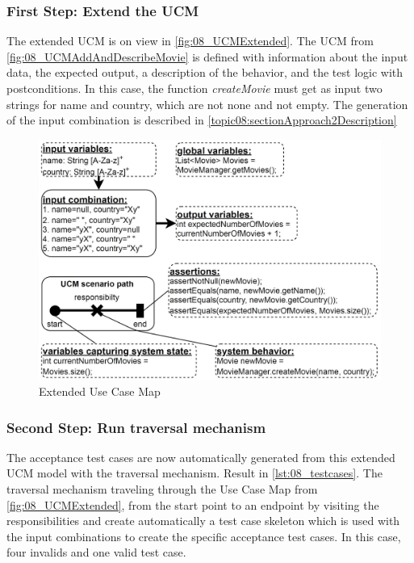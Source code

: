 \subsubsection{First Step: Extend the UCM}
The extended UCM is on view in \autoref{fig:08_UCMExtended}. The UCM from \autoref{fig:08_UCMAddAndDescribeMovie} is defined with information about the input
data, the expected output, a description of the behavior, and the test logic with postconditions. In this case, the function \textit{createMovie} must get as input two strings for name and country, which are not none and not empty. The generation of the input combination is described in \autoref{topic08:sectionApproach2Description}

\begin{figure}[h]
	\centering
	\includegraphics[scale=0.5]{../images/08/08_UCMExtended.jpg} 
	\caption{Extended Use Case Map}
	\label{fig:08_UCMExtended}
\end{figure}

\subsubsection{Second Step: Run traversal mechanism}
The acceptance test cases are now automatically generated from this extended UCM model with the traversal mechanism. Result in \autoref{lst:08_testcases}. The traversal mechanism traveling through the Use Case Map from \autoref{fig:08_UCMExtended}, from the start point to an endpoint by visiting the responsibilities and create automatically a test case skeleton which is used with the input combinations to create the specific acceptance test cases. In this case, four invalids and one valid test case.

